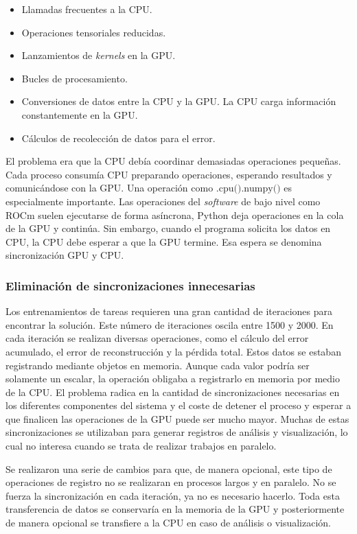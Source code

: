 \documentclass[11pt,a4paper,spanish]{book}
\numberwithin{equation}{chapter}
\numberwithin{figure}{chapter}
\begin{document}
\begin{itemize}
	\item Llamadas frecuentes a la CPU.
	\item Operaciones tensoriales reducidas.
	\item Lanzamientos de \textit{kernels} en la GPU.
	\item Bucles de procesamiento.
	\item Conversiones de datos entre la CPU y la GPU. La CPU carga información constantemente en la GPU.
	\item Cálculos de recolección de datos para el error.
\end{itemize}

El problema era que la CPU debía coordinar demasiadas operaciones pequeñas. Cada proceso consumía CPU 
preparando operaciones, esperando resultados y comunicándose con la GPU. Una operación como 
\(\text{.cpu().numpy()}\) es especialmente importante. Las operaciones del \textit{software} de bajo nivel como ROCm suelen ejecutarse de forma asíncrona, 
Python deja operaciones en la cola de la GPU y continúa. Sin embargo, cuando el programa solicita los datos en CPU, la CPU debe esperar a que la GPU termine. 
Esa espera se denomina sincronización GPU y CPU.

\subsubsection{Eliminación de sincronizaciones innecesarias}

Los entrenamientos de tareas requieren una gran cantidad de iteraciones para encontrar la solución. Este número de iteraciones oscila entre 1500 y
2000. En cada iteración se realizan diversas operaciones, como el cálculo del error acumulado, el error de reconstrucción y la pérdida total. Estos datos
se estaban registrando mediante objetos en memoria. Aunque cada valor podría ser solamente un escalar, la operación obligaba a registrarlo en 
memoria por medio de la CPU. El problema radica en la cantidad de sincronizaciones necesarias en los diferentes componentes del sistema y el
coste de detener el proceso y esperar a que finalicen las operaciones de la GPU puede ser mucho mayor. Muchas de estas sincronizaciones
se utilizaban para generar registros de análisis y visualización, lo cual no interesa cuando se trata de realizar trabajos en paralelo.

Se realizaron una serie de cambios para que, de manera opcional, este tipo de operaciones de registro
no se realizaran en procesos largos y en paralelo. No se fuerza la sincronización en cada iteración, ya no es necesario hacerlo. Toda esta transferencia de 
datos se conservaría en la memoria de la GPU y posteriormente de manera opcional se transfiere a la CPU en caso de análisis o visualización.
\end{document}
